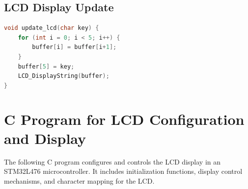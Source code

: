 \documentclass[12pt]{article}
\begin{document}
\subsection{LCD Display Update}
\begin{lstlisting}[language=C, caption={LCD Display Update}]
void update_lcd(char key) {
    for (int i = 0; i < 5; i++) {
        buffer[i] = buffer[i+1];
    }
    buffer[5] = key;
    LCD_DisplayString(buffer);
}
\end{lstlisting}

\section{C Program for LCD Configuration and Display}

The following C program configures and controls the LCD display in an STM32L476 microcontroller. It includes initialization functions, display control mechanisms, and character mapping for the LCD.
\end{document}
